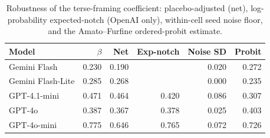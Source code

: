 \begin{table}[t]
\centering
\caption{Robustness of the terse-framing coefficient: placebo-adjusted (net), log-probability expected-notch (OpenAI only), within-cell seed noise floor, and the Amato--Furfine ordered-probit estimate.}
\label{tab:robust}
\begin{tabular}{lrrrrr}
\toprule
Model & $\beta$ & Net & Exp-notch & Noise SD & Probit \\
\midrule
Gemini Flash & 0.230 & 0.190 &  & 0.020 & 0.272 \\
Gemini Flash-Lite & 0.285 & 0.268 &  & 0.000 & 0.235 \\
GPT-4.1-mini & 0.471 & 0.464 & 0.420 & 0.086 & 0.307 \\
GPT-4o & 0.387 & 0.367 & 0.378 & 0.025 & 0.403 \\
GPT-4o-mini & 0.775 & 0.646 & 0.765 & 0.072 & 0.726 \\
\bottomrule
\end{tabular}
\end{table}